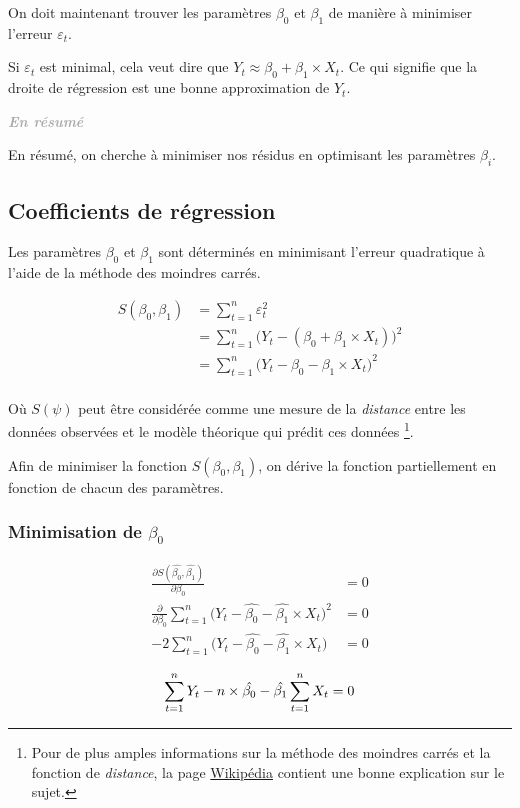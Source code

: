 \documentclass[11pt,french]{report}
\newenvironment{moreInfo}[1]
	{\begin{mdframed}
	\textcolor{darkgray}{\huge \raisebox{-3.5pt}{\faInfo} 
	\hspace{0.5cm} \large\bfseries #1}\\[5pt]
	\normalsize
	\makebox[0.1\textwidth][l]{}	
	\begin{minipage}{10cm}}
	{	\end{minipage}
	\end{mdframed}}
\begin{document}
On doit maintenant trouver les paramètres $\beta_0$ et $\beta_1$ de manière à minimiser l'erreur $\varepsilon_t$.

Si $\varepsilon_t$ est minimal, cela veut dire que $Y_t \approx \beta_0 + \beta_1\times X_t$. Ce qui signifie que la droite de régression est une bonne approximation de $Y_t$.

\begin{moreInfo}{\emph{En résumé}}
	En résumé, on cherche à minimiser nos résidus en optimisant les paramètres $\beta_i$. 
\end{moreInfo}

\subsection{Coefficients de régression}
\label{subsec:coeffreg}
Les paramètres $\beta_0$ et $\beta_1$ sont déterminés en minimisant l'erreur quadratique à l'aide de la méthode des moindres carrés.

\begin{align*}
S(\beta_0, \beta_1) &= \displaystyle\sum_{t=1}^n \varepsilon_t^2 \\
&= \displaystyle\sum_{t=1}^n \big( Y_t - (\beta_0 + \beta_1\times X_t) \big)^2 \\
&= \displaystyle\sum_{t=1}^n \big( Y_t - \beta_0 - \beta_1\times X_t \big)^2 \\
\end{align*}

Où $S(\psi)$ peut être considérée comme une mesure de la \emph{distance} entre les données observées et le modèle théorique qui prédit ces données \footnote{Pour de plus amples informations sur la méthode des moindres carrés et la fonction de \emph{distance}, la page \href{https://fr.wikipedia.org/wiki/Méthode_des_moindres_carrés}{Wikipédia} contient une bonne explication sur le sujet.}.

\bigskip
Afin de minimiser la fonction $S(\beta_0, \beta_1)$, on dérive la fonction partiellement en fonction de chacun des paramètres.

\subsubsection{Minimisation de $\beta_0$}
\begin{align*}
\frac{\partial S(\hat{\beta_0}, \hat{\beta_1})}{\partial \beta_0} &= 0 \\
\frac{\partial}{\partial \beta_0} \displaystyle\sum_{t=1}^n \big( Y_t - \hat{\beta_0} - \hat{\beta_1}\times X_t \big)^2 &= 0 \\
-2\displaystyle\sum_{t=1}^n \big( Y_t - \hat{\beta_0} - \hat{\beta_1} \times X_t \big) &= 0 \\
\end{align*}
\begin{equation}
\label{eq:minimisationbeta0}
\displaystyle\sum_{t=1}^n Y_t - n \times \hat{\beta_0} - \hat{\beta_1} \displaystyle\sum_{t=1}^n X_t = 0 \\
\end{equation}
\end{document}
